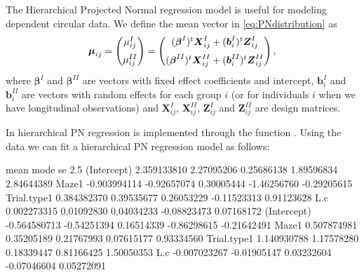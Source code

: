 The Hierarchical Projected Normal regression model
\citep{nunez2014bayesian} is useful for modeling dependent circular
data. We define the mean vector in \eqref{eq:PNdistribution} as
\begin{equation}
\boldsymbol{\mu}_{ij} = \begin{pmatrix}
  \mu_{ij}^{I}  \vspace{0.2cm}  \\
\mu_{ij}^{II}
 \end{pmatrix}=\begin{pmatrix}
  (\boldsymbol{\beta}^{I})^{t}\boldsymbol{X}_{ij}^{I} + (\boldsymbol{b}_i^{I})^t\boldsymbol{Z}_{ij}^{I} \vspace{0.2cm}  \\
  (\boldsymbol{\beta}^{II})^{t}\boldsymbol{X}_{ij}^{II} + (\boldsymbol{b}_i^{II})^t\boldsymbol{Z}_{ij}^{II}
 \end{pmatrix},
\end{equation} where \(\boldsymbol{\beta}^{I}\) and
\(\boldsymbol{\beta}^{II}\) are vectors with fixed effect coefficients
and intercept, \(\boldsymbol{b}_{i}^{I}\) and
\(\boldsymbol{b}_{i}^{II}\) are vectors with random effects for each
group \(i\) (or for individuals \(i\) when we have longitudinal
observations) and \(\boldsymbol{X}_{ij}^{I}\),
\(\boldsymbol{X}_{ij}^{II}\), \(\boldsymbol{Z}_{ij}^{I}\) and
\(\boldsymbol{Z}_{ij}^{II}\) are design matrices.

In  hierarchical PN regression is implemented through the
function . Using the  data
\citep{Warren2017} we can fit a hierarchical PN regression model as
follows:

\begin{CodeChunk}


\begin{CodeOutput}
                    mean        mode         se        2.5%
(Intercept)  2.359133810  2.27095206 0.25686138  1.89596834  2.84644389
Maze1       -0.903994114 -0.92657074 0.30005444 -1.46256760 -0.29205615
Trial.type1  0.384382370  0.39535677 0.26053229 -0.11523313  0.91123628
L.c          0.002273315  0.01092830 0.04034233 -0.08823473  0.07168172
(Intercept) -0.564580713 -0.54251394 0.16514339 -0.86298615 -0.21642491
Maze1        0.507874981  0.35205189 0.21767993  0.07615177  0.93334560
Trial.type1  1.140930788  1.17578280 0.18339447  0.81166425  1.50050353
L.c         -0.007023267 -0.01905147 0.03232604 -0.07046604  0.05272091
\end{CodeOutput}
\end{CodeChunk}

